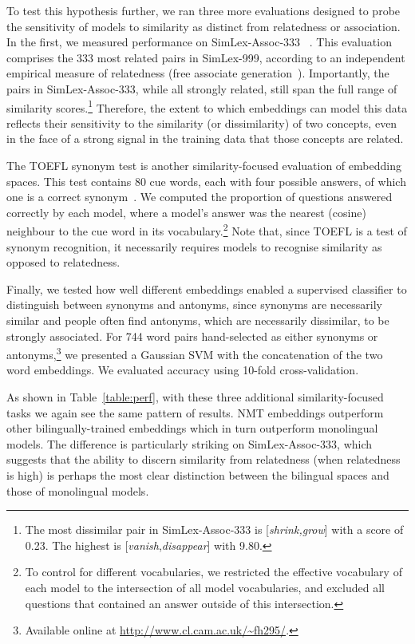 To test this hypothesis further, we ran three more evaluations designed to probe the sensitivity of models to similarity as distinct from relatedness or association. In the first, we measured performance on SimLex-Assoc-333 ~\cite{hill2014simlex}. This evaluation comprises the 333 most related pairs in SimLex-999, according to an independent empirical measure of relatedness (free associate generation~\cite{nelson2004university}). Importantly, the pairs in SimLex-Assoc-333, while all strongly related, still span the full range of similarity scores.\footnote{The most dissimilar pair in SimLex-Assoc-333 is [\emph{shrink,grow}] with a score of 0.23. The highest is [\emph{vanish},\emph{disappear}] with 9.80.} Therefore, the extent to which embeddings can model this data reflects their sensitivity to the similarity (or dissimilarity) of two concepts, even in the face of a strong signal in the training data that those concepts are related.    

The TOEFL synonym test is another similarity-focused evaluation of embedding spaces. This test contains 80 cue words, each with four possible answers, of which one is a correct synonym~\cite{landauer1997solution}. We computed the proportion of questions answered correctly by each model, where a model's answer was the nearest (cosine) neighbour to the cue word in its vocabulary.\footnote{To control for different vocabularies, we restricted the effective vocabulary of each model to the intersection of all model vocabularies, and excluded all questions that contained an answer outside of this intersection.} Note that, since TOEFL is a test of synonym recognition, it necessarily requires models to recognise similarity as opposed to relatedness.  

Finally, we tested how well different embeddings enabled a supervised classifier to distinguish between synonyms and antonyms, since synonyms are necessarily similar and people often find antonyms, which are necessarily dissimilar, to be strongly associated. For 744 word pairs hand-selected as either synonyms or antonyms,\footnote{Available online at \url{http://www.cl.cam.ac.uk/~fh295/}.} we presented a Gaussian SVM with the concatenation of the two word embeddings. We evaluated accuracy using 10-fold cross-validation. 

As shown in Table~\ref{table:perf}, with these three additional similarity-focused tasks we again see the same pattern of results. NMT embeddings outperform other bilingually-trained embeddings which in turn outperform monolingual models. The difference is particularly striking on SimLex-Assoc-333, which suggests that the ability to discern similarity from relatedness (when relatedness is high) is perhaps the most clear distinction between the bilingual spaces and those of monolingual models. 

